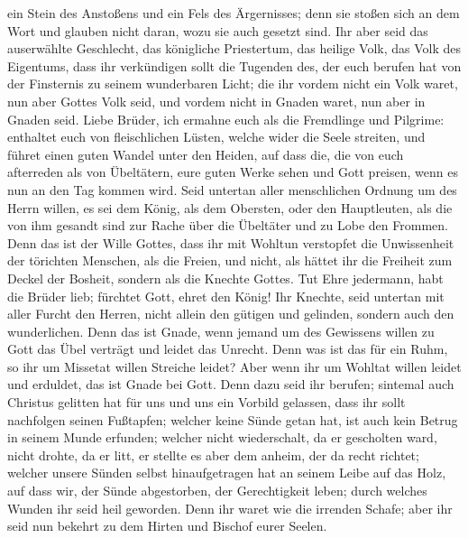  ein Stein des Anstoßens und ein Fels des Ärgernisses;
denn sie stoßen sich an dem Wort und glauben nicht daran, wozu sie auch
gesetzt sind.  Ihr aber seid das auserwählte Geschlecht,
das königliche Priestertum, das heilige Volk, das Volk des Eigentums,
dass ihr verkündigen sollt die Tugenden des, der euch berufen hat von
der Finsternis zu seinem wunderbaren Licht;  die ihr
vordem nicht ein Volk waret, nun aber Gottes Volk seid, und vordem nicht
in Gnaden waret, nun aber in Gnaden seid.  Liebe Brüder,
ich ermahne euch als die Fremdlinge und Pilgrime: enthaltet euch von
fleischlichen Lüsten, welche wider die Seele streiten, 
und führet einen guten Wandel unter den Heiden, auf dass die, die von
euch afterreden als von Übeltätern, eure guten Werke sehen und Gott
preisen, wenn es nun an den Tag kommen wird.  Seid
untertan aller menschlichen Ordnung um des Herrn willen, es sei dem
König, als dem Obersten,  oder den Hauptleuten, als die
von ihm gesandt sind zur Rache über die Übeltäter und zu Lobe den
Frommen.  Denn das ist der Wille Gottes, dass ihr mit
Wohltun verstopfet die Unwissenheit der törichten Menschen,
 als die Freien, und nicht, als hättet ihr die Freiheit
zum Deckel der Bosheit, sondern als die Knechte Gottes. 
Tut Ehre jedermann, habt die Brüder lieb; fürchtet Gott, ehret den
König!  Ihr Knechte, seid untertan mit aller Furcht den
Herren, nicht allein den gütigen und gelinden, sondern auch den
wunderlichen.  Denn das ist Gnade, wenn jemand um des
Gewissens willen zu Gott das Übel verträgt und leidet das Unrecht.
 Denn was ist das für ein Ruhm, so ihr um Missetat willen
Streiche leidet? Aber wenn ihr um Wohltat willen leidet und erduldet,
das ist Gnade bei Gott.  Denn dazu seid ihr berufen;
sintemal auch Christus gelitten hat für uns und uns ein Vorbild
gelassen, dass ihr sollt nachfolgen seinen Fußtapfen; 
welcher keine Sünde getan hat, ist auch kein Betrug in seinem Munde
erfunden;  welcher nicht wiederschalt, da er gescholten
ward, nicht drohte, da er litt, er stellte es aber dem anheim, der da
recht richtet;  welcher unsere Sünden selbst
hinaufgetragen hat an seinem Leibe auf das Holz, auf dass wir, der Sünde
abgestorben, der Gerechtigkeit leben; durch welches Wunden ihr seid heil
geworden.  Denn ihr waret wie die irrenden Schafe; aber
ihr seid nun bekehrt zu dem Hirten und Bischof eurer Seelen.

